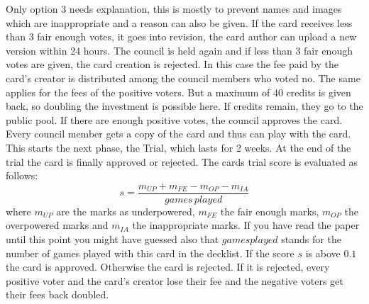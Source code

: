 \documentclass{article}
\begin{document}
%
Only option 3 needs explanation, this is mostly to prevent names and images which are inappropriate and a reason can also be given. If the card receives less than 3 fair enough votes, it goes into revision, the card author can upload a new version within 24 hours. The council is held again and if less than 3 fair enough votes are given, the card creation is rejected. In this case the fee paid by the card's creator is distributed among the council members who voted no. The same applies for the fees of the positive voters. But a maximum of 40 credits is given back, so doubling the investment is possible here. If credits remain, they go to the public pool. If there are enough positive votes, the council approves the card. Every council member gets a copy of the card and thus can play with the card. This starts the next phase, the Trial, which lasts for 2 weeks. At the end of the trial the card is finally approved or rejected. The cards trial score is evaluated as follows:
%
\begin{equation}%
s = \frac{m_{UP} +  m_{FE} - m_{OP} - m_{IA}}{games \, played}
\end{equation}
%
where $m_{UP}$ are the marks as underpowered, $m_{FE}$ the fair enough marks, $m_{OP}$ the overpowered marks and $m_{IA}$ the inappropriate marks. If you have read the paper until this point you might have guessed also that $games played$ stands for the number of games played with this card in the decklist. If the score $s$ is above $0.1$ the card is approved. Otherwise the card is rejected. If it is rejected, every positive voter and the card's creator lose their fee and the negative voters get their fees back doubled.
%
\end{document}
